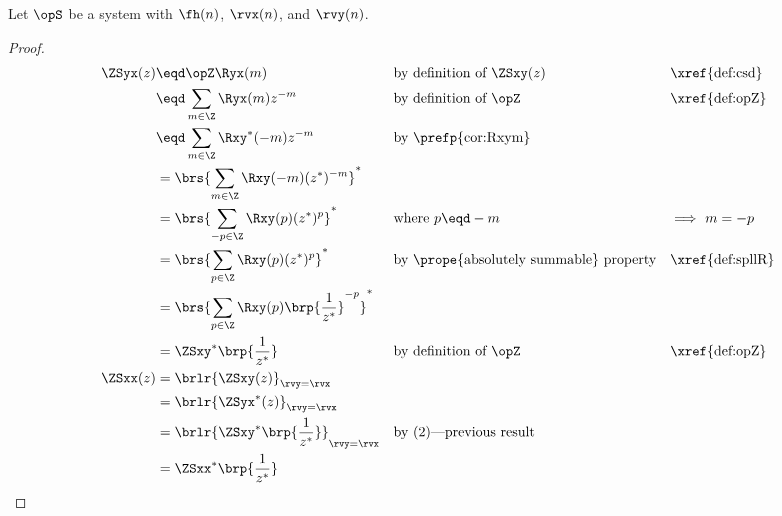 %
\begin{theorem}
\label{thm:ZSxy_sym}
Let $\opS$ be a system with  $\fh(n)$,
 $\rvx(n)$, and  $\rvy(n)$.
\end{theorem}
\begin{proof}
\begin{align*}
  \ZSyx(z)
     &\eqd \opZ \Ryx(m)
    && \text{by definition of $\ZSxy(z)$}
    && \text{\xref{def:csd}}
  \\&\eqd \sum_{m\in\Z}\Ryx(m) z^{-m}
    && \text{by definition of $\opZ$}
    && \text{\xref{def:opZ}}
  \\&\eqd \sum_{m\in\Z} \Rxy^\ast(-m) z^{-m}
    && \text{by \prefp{cor:Rxym}}
  \\&= \brs{\sum_{m\in\Z} \Rxy(-m) (z^\ast)^{-m}}^\ast
  \\&= \brs{\sum_{-p\in\Z} \Rxy(p) (z^\ast)^{p}}^\ast
    && \text{where $p\eqd -m$}
    && \text{$\implies$ $m=-p$}
  \\&= \brs{\sum_{p\in\Z} \Rxy(p) (z^\ast)^{p}}^\ast
    && \text{by \prope{absolutely summable} property}
    && \text{\xref{def:spllR}}
  \\&= \brs{\sum_{p\in\Z} \Rxy(p) \brp{\frac{1}{z^\ast}}^{-p}}^\ast
  \\&= \ZSxy^\ast\brp{\frac{1}{z^\ast}}
    && \text{by definition of $\opZ$}
    && \text{\xref{def:opZ}}
  \\
  \ZSxx(z)
    &= \brlr{\ZSxy(z)}_{\rvy=\rvx}
  \\&= \brlr{\ZSyx^\ast(z)}_{\rvy=\rvx}
  \\&= \brlr{\ZSxy^\ast\brp{\frac{1}{z^\ast}}}_{\rvy=\rvx}
    && \text{by (2)---previous result}
  \\&= \ZSxx^\ast\brp{\frac{1}{z^\ast}}
\end{align*}
\end{proof}

